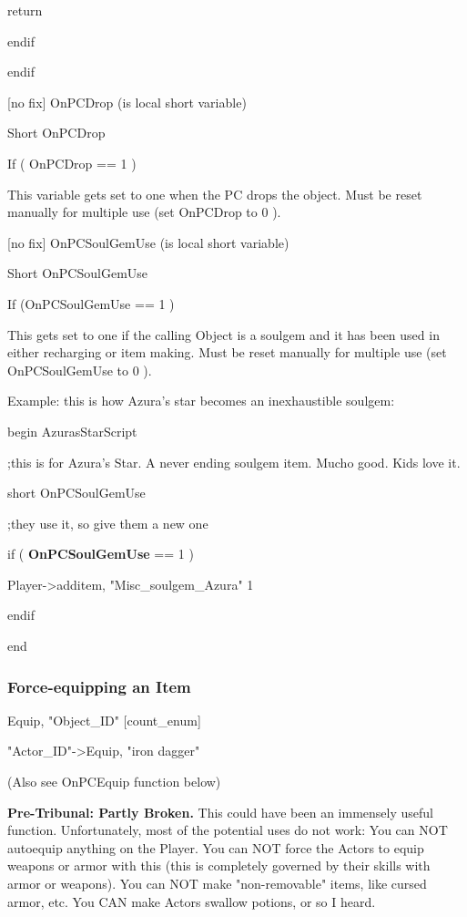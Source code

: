 \documentclass[
]{article}
\begin{document}
return

endif

endif

{[}no fix{]} OnPCDrop (is local short variable)

Short OnPCDrop

If ( OnPCDrop == 1 )

This variable gets set to one when the PC drops the object. Must be
reset manually for multiple use (set OnPCDrop to 0 ).

{[}no fix{]} OnPCSoulGemUse (is local short variable)

Short OnPCSoulGemUse

If (OnPCSoulGemUse == 1 )

This gets set to one if the calling Object is a soulgem and it has been
used in either recharging or item making. Must be reset manually for
multiple use (set OnPCSoulGemUse to 0 ).

Example: this is how Azura's star becomes an inexhaustible soulgem:

begin AzurasStarScript

;this is for Azura's Star. A never ending soulgem item. Mucho good. Kids
love it.

short OnPCSoulGemUse

;they use it, so give them a new one

if ( \textbf{OnPCSoulGemUse} == 1 )

Player-\textgreater additem, "Misc\_soulgem\_Azura" 1

endif

end

\hypertarget{force-equipping-an-item}{%
\subsubsection{\texorpdfstring{\hfill\break
Force-equipping an Item
}{ Force-equipping an Item }}\label{force-equipping-an-item}}

Equip, "Object\_ID" {[}count\_enum{]}

"Actor\_ID"-\textgreater Equip, "iron dagger"

(Also see OnPCEquip function below)

\textbf{Pre-Tribunal: Partly Broken.} This could have been an immensely
useful function. Unfortunately, most of the potential uses do not work:
You can NOT autoequip anything on the Player. You can NOT force the
Actors to equip weapons or armor with this (this is completely governed
by their skills with armor or weapons). You can NOT make "non-removable"
items, like cursed armor, etc. You CAN make Actors swallow potions, or
so I heard.
\end{document}

